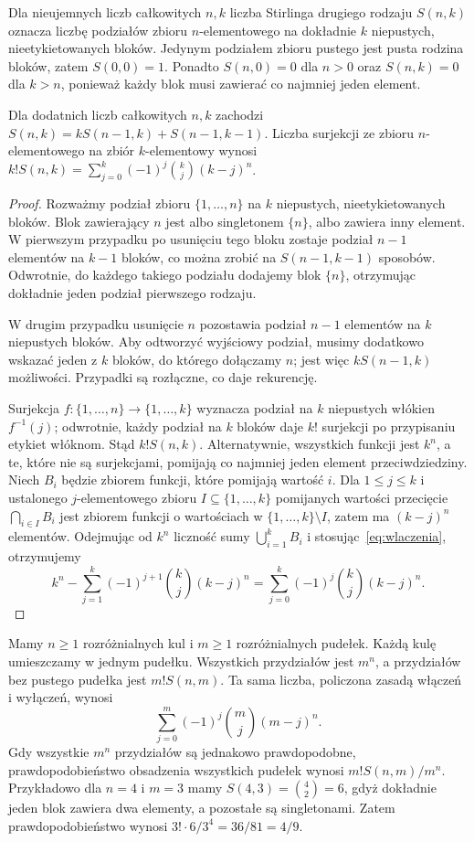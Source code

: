 \begin{definicja}
Dla nieujemnych liczb całkowitych $n,k$ liczba Stirlinga drugiego rodzaju $S(n,k)$ oznacza
liczbę podziałów zbioru $n$-elementowego na dokładnie $k$
niepustych, nieetykietowanych bloków. Jedynym podziałem
zbioru pustego jest pusta rodzina bloków, zatem $S(0,0)=1$.
Ponadto $S(n,0)=0$ dla $n>0$ oraz $S(n,k)=0$ dla $k>n$,
ponieważ każdy blok musi zawierać co najmniej jeden element.
\end{definicja}
\begin{stwierdzenie}
Dla dodatnich liczb całkowitych $n,k$ zachodzi
$S(n,k)=kS(n-1,k)+S(n-1,k-1)$.
Liczba surjekcji ze zbioru $n$-elementowego na zbiór $k$-elementowy
wynosi $k!S(n,k)=\sum_{j=0}^k(-1)^j\binom kj(k-j)^n$.
\end{stwierdzenie}
\begin{proof}
Rozważmy podział zbioru $\{1,\ldots,n\}$ na $k$
niepustych, nieetykietowanych bloków. Blok zawierający
$n$ jest albo singletonem $\{n\}$, albo zawiera inny
element. W pierwszym przypadku po usunięciu tego bloku
zostaje podział $n-1$ elementów na $k-1$ bloków,
co można zrobić na $S(n-1,k-1)$ sposobów. Odwrotnie,
do każdego takiego podziału dodajemy blok $\{n\}$,
otrzymując dokładnie jeden podział pierwszego rodzaju.

W drugim przypadku usunięcie $n$ pozostawia podział
$n-1$ elementów na $k$ niepustych bloków. Aby odtworzyć
wyjściowy podział, musimy dodatkowo wskazać jeden z $k$
bloków, do którego dołączamy $n$; jest więc
$kS(n-1,k)$ możliwości. Przypadki są rozłączne,
co daje rekurencję.

Surjekcja $f:\{1,\ldots,n\}\to\{1,\ldots,k\}$
wyznacza podział na $k$ niepustych włókien
$f^{-1}(j)$; odwrotnie, każdy podział na $k$ bloków
daje $k!$ surjekcji po przypisaniu etykiet włóknom.
Stąd $k!S(n,k)$. Alternatywnie, wszystkich funkcji jest
$k^n$, a te, które nie są surjekcjami, pomijają co najmniej
jeden element przeciwdziedziny. Niech $B_i$ będzie zbiorem funkcji, które pomijają wartość $i$.
Dla $1\leq j\leq k$ i ustalonego $j$-elementowego zbioru
$I\subseteq\{1,\ldots,k\}$ pomijanych wartości
przecięcie $\bigcap_{i\in I}B_i$ jest zbiorem funkcji
o wartościach w $\{1,\ldots,k\}\setminus I$, zatem ma
$(k-j)^n$ elementów. Odejmując od $k^n$ liczność sumy
$\bigcup_{i=1}^k B_i$ i stosując~\eqref{eq:wlaczenia}, otrzymujemy
\[
k^n-\sum_{j=1}^k(-1)^{j+1}\binom kj(k-j)^n
=\sum_{j=0}^k(-1)^j\binom kj(k-j)^n.
\]
\end{proof}

\begin{przyklad}
Mamy $n\geq1$ rozróżnialnych kul i $m\geq1$ rozróżnialnych pudełek.
Każdą kulę umieszczamy w jednym pudełku. Wszystkich przydziałów
jest $m^n$, a przydziałów bez pustego pudełka jest $m!S(n,m)$.
Ta sama liczba, policzona zasadą włączeń i wyłączeń, wynosi
\[
\sum_{j=0}^{m}(-1)^j\binom mj(m-j)^n.
\]
Gdy wszystkie $m^n$ przydziałów są jednakowo prawdopodobne,
prawdopodobieństwo obsadzenia wszystkich pudełek wynosi
$m!S(n,m)/m^n$. Przykładowo dla $n=4$ i $m=3$
mamy $S(4,3)=\binom42=6$, gdyż dokładnie jeden blok zawiera
dwa elementy, a pozostałe są singletonami. Zatem prawdopodobieństwo
wynosi $3!\cdot6/3^4=36/81=4/9$.
\end{przyklad}

